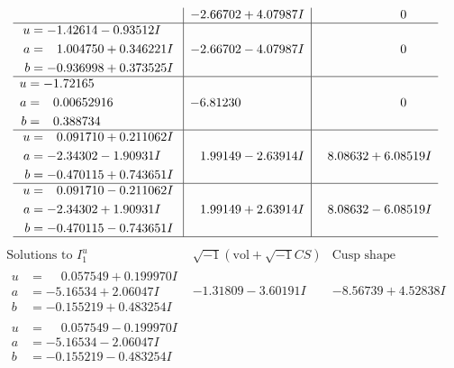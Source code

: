 \documentclass[1p]{elsarticle_modified}
\theoremstyle{definition}
\newcommand{\I}{\sqrt{-1}}
\begin{document}
$$\begin{array}{c|c|c}
 & -2.66702 + 4.07987 I & \phantom{-0.000000 } 0 \\ \hline\begin{aligned}
u &= -1.42614 - 0.93512 I \\
a &= \phantom{-}1.004750 + 0.346221 I \\
b &= -0.936998 + 0.373525 I\end{aligned}
 & -2.66702 - 4.07987 I & \phantom{-0.000000 } 0 \\ \hline\begin{aligned}
u &= -1.72165\phantom{ +0.000000I} \\
a &= \phantom{-}0.00652916\phantom{ +0.000000I} \\
b &= \phantom{-}0.388734\phantom{ +0.000000I}\end{aligned}
 & -6.81230\phantom{ +0.000000I} & \phantom{-0.000000 } 0 \\ \hline\begin{aligned}
u &= \phantom{-}0.091710 + 0.211062 I \\
a &= -2.34302 - 1.90931 I \\
b &= -0.470115 + 0.743651 I\end{aligned}
 & \phantom{-}1.99149 - 2.63914 I & \phantom{-}8.08632 + 6.08519 I \\ \hline\begin{aligned}
u &= \phantom{-}0.091710 - 0.211062 I \\
a &= -2.34302 + 1.90931 I \\
b &= -0.470115 - 0.743651 I\end{aligned}
 & \phantom{-}1.99149 + 2.63914 I & \phantom{-}8.08632 - 6.08519 I\\
 \hline 
 \end{array}$$\newpage$$\begin{array}{c|c|c}  
\text{Solutions to }I^u_{1}& \I (\text{vol} + \sqrt{-1}CS) & \text{Cusp shape}\\
 \hline 
\begin{aligned}
u &= \phantom{-}0.057549 + 0.199970 I \\
a &= -5.16534 + 2.06047 I \\
b &= -0.155219 + 0.483254 I\end{aligned}
 & -1.31809 - 3.60191 I & -8.56739 + 4.52838 I \\ \hline\begin{aligned}
u &= \phantom{-}0.057549 - 0.199970 I \\
a &= -5.16534 - 2.06047 I \\
b &= -0.155219 - 0.483254 I\end{aligned}

\end{array}$$
\end{document}
